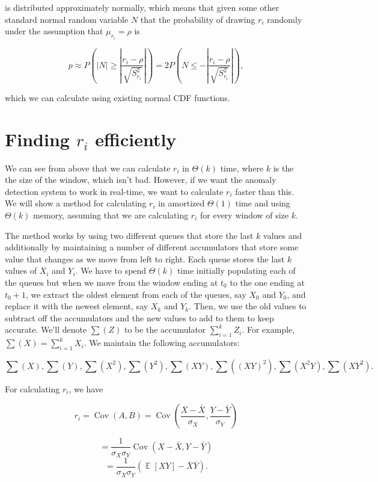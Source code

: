 \documentclass{article}
\DeclareMathOperator{\E}{\mathbb{E}}
\DeclareMathOperator{\Cov}{\mathrm{Cov}}
\begin{document}
is distributed approximately normally, which means that given some other standard normal random variable $N$ that the probability of drawing $r_i$ randomly under the assumption that $\mu_{r_i} = \rho$ is

$$p \approx P\left(|N| \ge \left|\frac{r_i - \rho}{\sqrt{S^2_{r_i}}}\right|\right)
= 2P\left(N \le -\left|\frac{r_i - \rho}{\sqrt{S^2_{r_i}}}\right|\right),$$

which we can calculate using existing normal CDF functions.

\section{Finding $r_i$ efficiently}

We can see from above that we can calculate $r_i$ in $\Theta(k)$ time, where $k$ is the the size of the window, which isn't bad. However, if we want the anomaly detection system to work in real-time, we want to calculate $r_i$ faster than this. We will show a method for calculating $r_i$ in amortized $\Theta(1)$ time and using $\Theta(k)$ memory, assuming that we are calculating $r_i$ for every window of size $k$.

The method works by using two different queues that store the last $k$ values and additionally by maintaining a number of different accumulators that store some value that changes as we move from left to right. Each queue stores the last $k$ values of $X_i$ and $Y_i$. We have to spend $\Theta(k)$ time initially populating each of the queues but when we move from the window ending at $t_0$ to the one ending at $t_0 + 1$, we extract the oldest element from each of the queues, say $X_0$ and $Y_0$, and replace it with the newest element, say $X_k$ and $Y_k$. Then, we use the old values to subtract off the accumulators and the new values to add to them to keep accurate. We'll denote $\sum(Z)$ to be the accumulator $\sum_{i = 1}^k Z_i$. For example, $\sum(X) = \sum_{i = 1}^k X_i$. We maintain the following accumulators:

$$\sum(X), \sum(Y), \sum(X^2), \sum(Y^2), \sum(XY), \sum((XY)^2), \sum(X^2 Y), \sum(XY^2).$$

For calculating $r_i$, we have

$$r_i = \Cov(A, B) = \Cov \left( \frac{X - \bar X}{\sigma_X}, \frac{Y - \bar Y}{\sigma_Y}\right)$$

$$= \frac{1}{\sigma_X \sigma_Y} \Cov(X - \bar X, Y - \bar Y)$$
$$ = \frac{1}{\sigma_X \sigma_Y} (\E[XY] - \bar X \bar Y).$$
\end{document}
